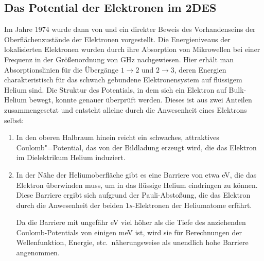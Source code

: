 \subsection{Das Potential der Elektronen im 2DES}
Im Jahre 1974 wurde dann von  und  \cite{Gri74} ein direkter Beweis des Vorhandenseins der Oberflächenzustände der Elektronen vorgestellt. Die Energieniveaus der lokalisierten Elektronen wurden durch ihre  Absorption von Mikrowellen bei einer Frequenz in der Größenordnung von \unit[100]{GHz} nachgewiesen. Hier erhält man Absorptionslinien für die Übergänge $1\rightarrow2$ und $2\rightarrow3$, deren Energien charakteristisch für das schwach gebundene Elektronensystem auf flüssigem Helium sind.
Die Struktur des Potentials, in dem sich ein Elektron auf Bulk-Helium bewegt, konnte genauer überprüft werden. Dieses ist aus zwei Anteilen zusammengesetzt und entsteht alleine durch die Anwesenheit eines Elektrons selbst:

\begin{enumerate}
    \item In den oberen Halbraum hinein reicht ein schwaches, attraktives Coulomb"=Potential, das von der Bildladung erzeugt wird, die das Elektron im Dielektrikum Helium induziert.
    \item In der Nähe der Heliumoberfläche gibt es eine Barriere von etwa \unit[1]{eV}, die das Elektron überwinden muss, um in das flüssige Helium eindringen zu können. Diese Barriere ergibt sich aufgrund der Pauli-Abstoßung, die das Elektron durch die Anwesenheit der beiden $1s$-Elektronen der Heliumatome erfährt.

Da die Barriere mit ungefähr \unit[1]{eV} viel höher als die Tiefe des anziehenden Coulomb-Potentials von einigen meV ist, wird sie für Berechnungen der Wellenfunktion, Energie, etc.\ näherungsweise als unendlich hohe Barriere angenommen.
\end{enumerate}


